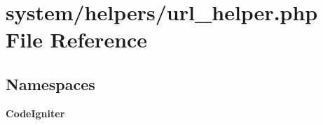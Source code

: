 \section{system/helpers/url\-\_\-helper.php File Reference}
\label{url__helper_8php}
\subsection*{Namespaces}
\begin{DoxyCompactItemize}
\item 
{\bf Code\-Igniter}
\end{DoxyCompactItemize}
